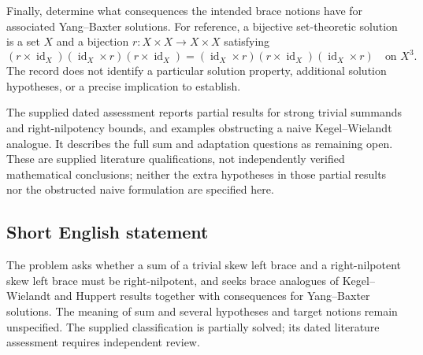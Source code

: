 \documentclass[11pt]{article}
\begin{document}
Finally, determine what consequences the intended brace notions have for associated Yang--Baxter solutions. For reference, a bijective set-theoretic solution is a set \(X\) and a bijection \(r:X\times X\to X\times X\) satisfying
\[
(r\times\operatorname{id}_X)(\operatorname{id}_X\times r)(r\times\operatorname{id}_X)
=
(\operatorname{id}_X\times r)(r\times\operatorname{id}_X)(\operatorname{id}_X\times r)
\quad\text{on }X^3.
\]
The record does not identify a particular solution property, additional solution hypotheses, or a precise implication to establish.

The supplied dated assessment reports partial results for strong trivial summands and right-nilpotency bounds, and examples obstructing a naive Kegel--Wielandt analogue. It describes the full sum and adaptation questions as remaining open. These are supplied literature qualifications, not independently verified mathematical conclusions; neither the extra hypotheses in those partial results nor the obstructed naive formulation are specified here.
\subsection{Short English statement}
The problem asks whether a sum of a trivial skew left brace and a right-nilpotent skew left brace must be right-nilpotent, and seeks brace analogues of Kegel--Wielandt and Huppert results together with consequences for Yang--Baxter solutions. The meaning of sum and several hypotheses and target notions remain unspecified. The supplied classification is partially solved; its dated literature assessment requires independent review.
\end{document}
